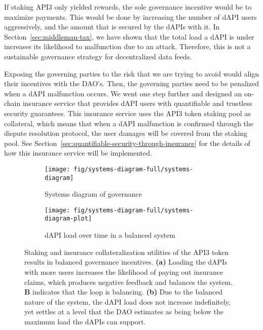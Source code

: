 \documentclass[11pt]{article}
\begin{document}
If staking API3 only yielded rewards, the sole governance incentive would be to maximize payments.
This would be done by increasing the number of dAPI users aggressively, and the amount that is secured by the dAPIs with it.
In Section~\ref{sec:middleman-tax}, we have shown that the total load a dAPI is under increases its likelihood to malfunction due to an attack.
Therefore, this is not a sustainable governance strategy for decentralized data feeds.

Exposing the governing parties to the risk that we are trying to avoid would align their incentives with the DAO’s.
Then, the governing parties need to be penalized when a dAPI malfunction occurs.
We went one step further and designed an on-chain insurance service that provides dAPI users with quantifiable and trustless security guarantees.
This insurance service uses the API3 token staking pool as collateral, which means that when a dAPI malfunction is confirmed through the dispute resolution protocol, the user damages will be covered from the staking pool.
See Section~\ref{sec:quantifiable-security-through-insurance} for the details of how this insurance service will be implemented.

\begin{figure}
     \centering
     \begin{subfigure}{0.49\textwidth}
         \texttt{[image: fig/systems-diagram-full/systems-diagram]}
         \caption{Systems diagram of governance}
         \label{fig:systems-diagram}
     \end{subfigure}
     \begin{subfigure}{0.49\textwidth}
         \texttt{[image: fig/systems-diagram-full/systems-diagram-plot]}
         \caption{dAPI load over time in a balanced system}
         \label{fig:systems-diagram-plot}
     \end{subfigure}
    \caption{Staking and insurance collateralization utilities of the API3 token results in balanced governance incentives.
    \textbf{(a)} Loading the dAPIs with more users increases the likelihood of paying out insurance claims, which produces negative feedback and balances the system. \textbf{B} indicates that the loop is balancing.
   \textbf{(b)} Due to the balanced nature of the system, the dAPI load does not increase indefinitely, yet settles at a level that the DAO estimates as being below the maximum load the dAPIs can support.}
    \label{fig:systems-diagram-full}
\end{figure}
\end{document}
